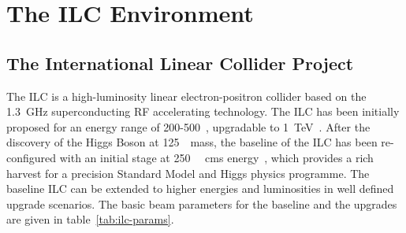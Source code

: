 \chapter{The ILC Environment}
\label{chap:ilc}
\label{ild:sec:ilc}
\section{The International Linear Collider Project}
The ILC is a high-luminosity linear electron-positron collider based on the 1.3~GHz superconducting RF accelerating technology. The ILC has been initially proposed for an energy range of 200-500~\GeV, upgradable to 1~TeV~\cite{Behnke:2013xla}. After the discovery of the Higgs Boson at 125~\GeV~mass, the baseline of the ILC has been re-configured with an initial stage at 250~\GeV~ cms energy~\cite{Bambade:2019fyw}, which provides a rich harvest for a precision Standard Model and Higgs physics programme. The baseline ILC can be extended to higher energies and luminosities in well defined upgrade scenarios. The basic beam parameters for the baseline and the upgrades are given in table~\ref{tab:ilc-params}.

